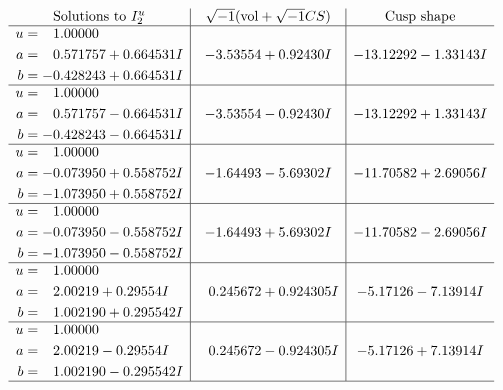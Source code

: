 \documentclass[1p]{elsarticle_modified}
\theoremstyle{definition}
\newcommand{\I}{\sqrt{-1}}
\begin{document}
$$\begin{array}{c|c|c}  
\text{Solutions to }I^u_{2}& \I (\text{vol} + \sqrt{-1}CS) & \text{Cusp shape}\\
 \hline 
\begin{aligned}
u &= \phantom{-}1.00000\phantom{ +0.000000I} \\
a &= \phantom{-}0.571757 + 0.664531 I \\
b &= -0.428243 + 0.664531 I\end{aligned}
 & -3.53554 + 0.92430 I & -13.12292 - 1.33143 I \\ \hline\begin{aligned}
u &= \phantom{-}1.00000\phantom{ +0.000000I} \\
a &= \phantom{-}0.571757 - 0.664531 I \\
b &= -0.428243 - 0.664531 I\end{aligned}
 & -3.53554 - 0.92430 I & -13.12292 + 1.33143 I \\ \hline\begin{aligned}
u &= \phantom{-}1.00000\phantom{ +0.000000I} \\
a &= -0.073950 + 0.558752 I \\
b &= -1.073950 + 0.558752 I\end{aligned}
 & -1.64493 - 5.69302 I & -11.70582 + 2.69056 I \\ \hline\begin{aligned}
u &= \phantom{-}1.00000\phantom{ +0.000000I} \\
a &= -0.073950 - 0.558752 I \\
b &= -1.073950 - 0.558752 I\end{aligned}
 & -1.64493 + 5.69302 I & -11.70582 - 2.69056 I \\ \hline\begin{aligned}
u &= \phantom{-}1.00000\phantom{ +0.000000I} \\
a &= \phantom{-}2.00219 + 0.29554 I \\
b &= \phantom{-}1.002190 + 0.295542 I\end{aligned}
 & \phantom{-}0.245672 + 0.924305 I & -5.17126 - 7.13914 I \\ \hline\begin{aligned}
u &= \phantom{-}1.00000\phantom{ +0.000000I} \\
a &= \phantom{-}2.00219 - 0.29554 I \\
b &= \phantom{-}1.002190 - 0.295542 I\end{aligned}
 & \phantom{-}0.245672 - 0.924305 I & -5.17126 + 7.13914 I\\
 \hline 
 \end{array}$$\newpage\newpage\renewcommand{\arraystretch}{1}
\end{document}
